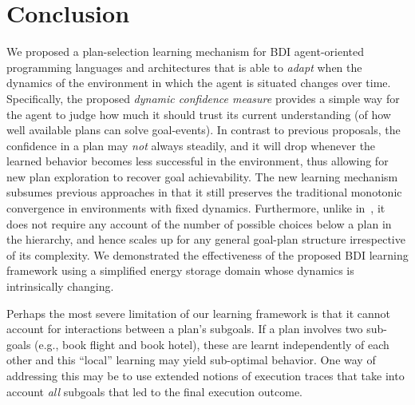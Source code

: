 \section{Conclusion}\label{sec:discussion}

We proposed a plan-selection learning mechanism for BDI agent-oriented programming languages and architectures that is able to \emph{adapt} when the dynamics of the environment in which the agent is situated changes over time.
Specifically, the proposed \emph{dynamic confidence measure} provides a simple way for the agent to judge how much it should trust its current understanding (of how well available plans can solve goal-events). 
In contrast to previous proposals, the confidence in a plan may \emph{not} always steadily, and it will drop whenever the learned behavior becomes less successful in the environment, thus allowing for new plan exploration to recover goal achievability. 
%
The new learning mechanism subsumes previous approaches in that it still preserves the traditional monotonic convergence in environments with fixed dynamics.
%
Furthermore, unlike in~\cite{singh10:extending,singh10:learning}, it does not require any account of the number of possible choices below a plan in the hierarchy, and hence scales up for any general goal-plan structure irrespective of its complexity. 
We demonstrated the effectiveness of the proposed BDI learning framework using a simplified energy storage domain whose dynamics is intrinsically changing.

Perhaps the most severe limitation of our learning framework is that it cannot account for interactions between a plan's subgoals. If a plan involves two sub-goals (e.g., book flight and book hotel), these are learnt independently of each other and this ``local'' learning may yield sub-optimal behavior. One way of addressing this may be to use extended notions of execution traces that take into account \emph{all} subgoals that led to the final execution outcome.


